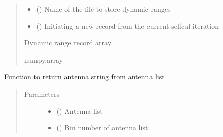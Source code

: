 \documentclass[letterpaper,10pt,english]{sphinxmanual}
\begin{document}
\begin{fulllineitems}
\begin{fulllineitems}
\begin{quote}
\begin{description}
\begin{itemize}
\item {} 
\sphinxAtStartPar
{} () \textendash{} Name of the file to store dynamic ranges

\item {} 
\sphinxAtStartPar
{} () \textendash{} Initiating a new record from the current selfcal iteration

\end{itemize}

\item[{Returns}] \leavevmode
\sphinxAtStartPar
Dynamic range record array

\item[{Return type}] \leavevmode
\sphinxAtStartPar
numpy.array

\end{description}\end{quote}

\end{fulllineitems}


\begin{fulllineitems}
\label{\detokenize{paircars:paircars.intensity_selfcal_LTS.IntensitySelfcal.antenna_string}}
\sphinxAtStartPar
Function to return antenna string from antenna list
\begin{quote}\begin{description}
\item[{Parameters}] \leavevmode\begin{itemize}
\item {} 
\sphinxAtStartPar
{} () \textendash{} Antenna list

\item {} 
\sphinxAtStartPar
{} () \textendash{} Bin number of antenna list

\end{itemize}


\end{description}
\end{quote}
\end{fulllineitems}
\end{fulllineitems}
\end{document}
